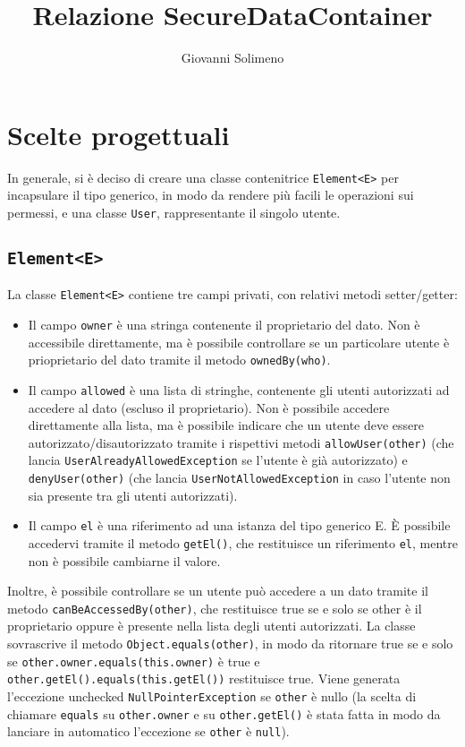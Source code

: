 \documentclass{article}
\title{Relazione SecureDataContainer}
\author{Giovanni Solimeno}
\begin{document}
	\maketitle

	\newpage

	\section[Scelte progettuali]{Scelte progettuali}
	In generale, si è deciso di creare una classe contenitrice \texttt{Element<E>} per incapsulare il tipo generico, in modo da rendere più facili le operazioni sui permessi, e una classe \texttt{User}, rappresentante il singolo utente.

\subsection{\texttt{Element<E>}}
La classe \texttt{Element<E>} contiene tre campi privati, con relativi metodi setter/getter:
\begin{itemize}
\item Il campo \texttt{owner} è una stringa contenente il proprietario del dato.
Non è accessibile direttamente, ma è possibile controllare se un particolare utente è prioprietario del dato tramite il metodo \texttt{ownedBy(who)}.

\item Il campo \texttt{allowed} è una lista di stringhe, contenente gli utenti autorizzati ad accedere al dato (escluso il proprietario).
Non è possibile accedere direttamente alla lista, ma è possibile indicare che un utente deve essere autorizzato/disautorizzato tramite i rispettivi metodi \texttt{allowUser(other)} (che lancia \texttt{UserAlreadyAllowedException} se l'utente è già autorizzato) e \texttt{denyUser(other)} (che lancia \texttt{UserNotAllowedException} in caso l'utente non sia presente tra gli utenti autorizzati).

\item Il campo \texttt{el} è una riferimento ad una istanza del tipo generico E. È possibile accedervi tramite il metodo \texttt{getEl()}, che restituisce un riferimento \texttt{el}, mentre non è possibile cambiarne il valore.
\end{itemize}
Inoltre, è possibile controllare se un utente può accedere a un dato tramite il metodo \texttt{canBeAccessedBy(other)}, che restituisce true se e solo se other è il proprietario oppure è presente nella lista degli utenti autorizzati.\break
La classe sovrascrive il metodo \texttt{Object.equals(other)}, in modo da ritornare true se e solo se \texttt{other.owner.equals(this.owner)} è true e \break\texttt{other.getEl().equals(this.getEl())} restituisce true. \break Viene generata l'eccezione unchecked \texttt{NullPointerException} se \texttt{other} è nullo (la scelta di chiamare \texttt{equals} su \texttt{other.owner} e su \texttt{other.getEl()} è stata fatta in modo da lanciare in automatico l'eccezione se \texttt{other} è \texttt{null}).
\end{document}
